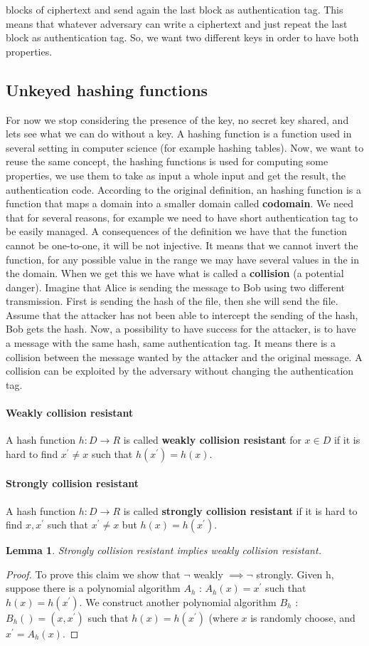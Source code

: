 \documentclass[11pt]{article}
\newtheorem{lemma}{Lemma}
\begin{document}
blocks of ciphertext and send again the last block as authentication tag. This means that whatever adversary can write a ciphertext and just repeat the last block as authentication tag. So, we want two different keys in order to have both properties.
\subsection{Unkeyed hashing functions}
For now we stop considering the presence of the key, no secret key shared, and lets see what we can do without a key. A hashing function is a function used in several setting in computer science (for example hashing tables). Now, we want to reuse the same concept, the hashing functions is used for computing some properties, we use them to take as input a whole input and get the result, the authentication code. According to the original definition, an hashing function is a function that maps a domain into a smaller domain called \textbf{codomain}. We need that for several reasons, for example we need to have short authentication tag to be easily managed. A consequences of the definition we have that the function cannot be one-to-one, it will be not injective. It means that we cannot invert the function, for any possible value in the range we may have several values in the in the domain. When we get this we have what is called a \textbf{collision} (a potential danger). Imagine that Alice is sending the message to Bob using two different transmission. First is sending the hash of the file, then she will send the file. Assume that the attacker has not been able to intercept the sending of the hash, Bob gets the hash. Now, a possibility to have success for the attacker, is to have a message with the same hash, same authentication tag. It means there is a collision between the message wanted by the attacker and the original message. A collision can be exploited by the adversary without changing the authentication tag. 
\paragraph{Weakly collision resistant} A hash function $h : D \rightarrow R$ is called \textbf{weakly collision resistant} for $x \in D$ if it is hard to find $x^{'} \neq x$ such that $h(x^{'}) = h(x)$.
\paragraph{Strongly collision resistant} A hash function $h : D \rightarrow R$ is called \textbf{strongly collision resistant} if it is hard to find $x, x^{'}$ such that $x^{'} \neq x$ but $h(x) = h(x^{'})$.
\begin{lemma}
Strongly collision resistant implies weakly collision resistant.
\end{lemma}
\begin{proof}
To prove this claim we show that $\neg$ weakly $\implies \neg$ strongly. Given h, suppose there is a polynomial algorithm $A_h$ : $A_h(x) = x^{'}$ such that $h(x) = h(x^{'})$. We construct another polynomial algorithm $B_h$ : $B_h() = (x, x^{'})$ such that $h(x) = h(x^{'})$ (where $x$ is randomly choose, and $x^{'} = A_h(x)$.
\end{proof}
\end{document}
